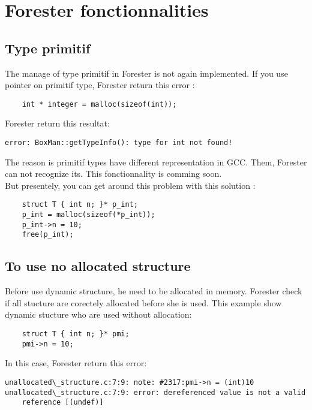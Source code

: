 \section {Forester fonctionnalities}

	\subsection{Type primitif}

The manage of type primitif in Forester is not again implemented. If you use pointer on primitif type, Forester return this error :

\begin{lstlisting}
	int * integer = malloc(sizeof(int));
\end{lstlisting}
\bigskip

Forester return this resultat:
\begin{lstlisting}
error: BoxMan::getTypeInfo(): type for int not found!
\end{lstlisting}
\bigskip


The reason is primitif types have different representation in GCC. Them, Forester can not recognize its. This fonctionnality is comming soon.
\\

But presentely, you can get around this problem with this solution :
\begin{lstlisting}
	struct T { int n; }* p_int;
	p_int = malloc(sizeof(*p_int));
	p_int->n = 10;
	free(p_int);
\end{lstlisting}
\bigskip

	\subsection{To use no allocated structure}
	
Before use dynamic structure, he need to be allocated in memory. Forester check if all stucture are corectely allocated before she is used. This example show dynamic stucture who are used without allocation:
\begin{lstlisting}
	struct T { int n; }* pmi;
	pmi->n = 10;
\end{lstlisting}
\bigskip

In this case, Forester return this error:
\begin{lstlisting}
unallocated\_structure.c:7:9: note: #2317:pmi->n = (int)10
unallocated\_structure.c:7:9: error: dereferenced value is not a valid 
	reference [(undef)]
\end{lstlisting}
\bigskip

